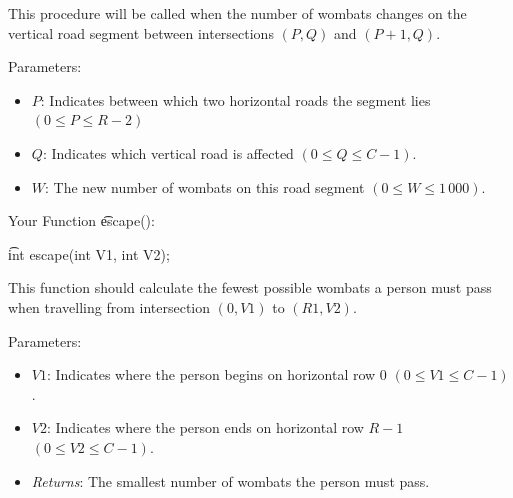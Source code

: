 This procedure will be called when the number of wombats changes on the vertical road segment between intersections $(P, Q)$ and $(P + 1, Q)$.

Parameters:
\begin{itemize}
\item $P$: Indicates between which two horizontal roads the segment lies $(0 \leq P \leq R -­ 2)$
\item $Q$: Indicates which vertical road is affected $(0 \leq Q \leq C -­ 1)$.
\item $W$: The new number of wombats on this road segment $( 0 \leq W \leq 1\,000)$.
\end{itemize}


            
Your Function \t{escape()}:

\t{int escape(int V1, int V2);}

This function should calculate the fewest possible wombats a person must pass when travelling from intersection $(0, V1)$ to $(R­1, V2)$.

Parameters:
\begin{itemize}
\item $V1$: Indicates where the person begins on horizontal row $0$ $( 0 \leq V1 \leq C­-1 )$.
\item $V2$: Indicates where the person ends on horizontal row $R-­1$ $( 0 \leq V2 \leq C­-1 )$.
\item \textit{Returns}: The smallest number of wombats the person must pass.
\end{itemize}
